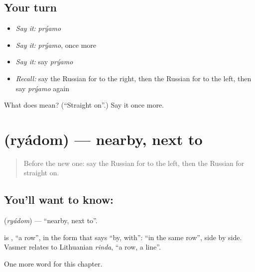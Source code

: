 \subsection*{Your turn}
\begin{itemize}
\raggedright
  \item \emph{Say it:} \emph{prýamo}
  \item \emph{Say it:} \emph{prýamo}, once more
  \item \emph{Say it:} say \emph{prýamo}
  \item \emph{Recall:} say the Russian for to the right, then the Russian for to the left, then say \emph{prýamo} again
\end{itemize}

\begin{tcolorbox}[breakable,colback=teal!4,colframe=teal!35!black,title={Before you move on}]
What does  mean? (\textquotedblleft{}Straight on\textquotedblright{}.) Say it once more.
\end{tcolorbox}
\section[\texorpdfstring{\ru{рядом} (ryádom)}{рядом (ryádom)}]{ (ryádom) — nearby, next to}

\label{lesson:RU-C87-nearby}



\begin{quote}
Before the new one: say the Russian for to the left, then the Russian for straight on.
\end{quote}

\subsection*{You'll want to know: }
\textbf{} (\emph{ryádom}) — \textquotedblleft{}nearby, next to\textquotedblright{}.

\begin{cousinweb}
\textbf{} is \emph{}, \textquotedblleft{}a row\textquotedblright{}, in the form that says \textquotedblleft{}by, with\textquotedblright{}: \textquotedblleft{}in the same row\textquotedblright{}, side by side. Vasmer relates \emph{} to Lithuanian \emph{rinda}, \textquotedblleft{}a row, a line\textquotedblright{}.
\end{cousinweb}

\begin{grammarlens}[title={What you've built}]
One more word for this chapter.
\end{grammarlens}

